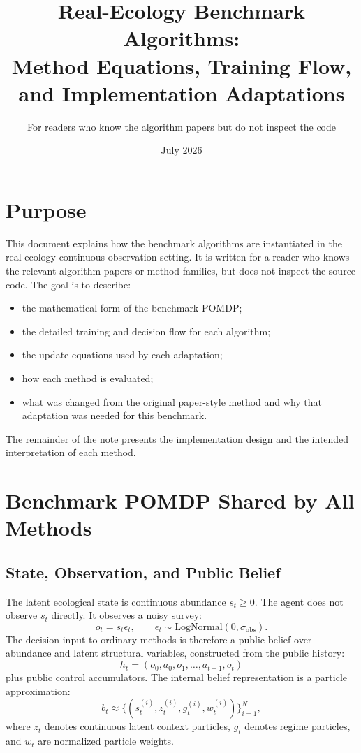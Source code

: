\documentclass[11pt]{article}
\title{Real-Ecology Benchmark Algorithms:\\Method Equations, Training Flow, and Implementation Adaptations}
\author{For readers who know the algorithm papers but do not inspect the code}
\date{July 2026}
\newcommand{\1}{\mathbf{1}}
\begin{document}
\sloppy
\maketitle

\section{Purpose}

This document explains how the benchmark algorithms are instantiated in the
real-ecology continuous-observation setting.  It is written for a reader who
knows the relevant algorithm papers or method families, but does not inspect the
source code.  The goal is to describe:
\begin{itemize}[leftmargin=*]
  \item the mathematical form of the benchmark POMDP;
  \item the detailed training and decision flow for each algorithm;
  \item the update equations used by each adaptation;
  \item how each method is evaluated;
  \item what was changed from the original paper-style method and why that
  adaptation was needed for this benchmark.
\end{itemize}

The remainder of the note presents the implementation design and the intended
interpretation of each method.

\section{Benchmark POMDP Shared by All Methods}

\subsection{State, Observation, and Public Belief}

The latent ecological state is continuous abundance $s_t\ge 0$.  The agent does
not observe $s_t$ directly.  It observes a noisy survey:
\[
  o_t = s_t\epsilon_t,\qquad
  \epsilon_t\sim\mathrm{LogNormal}(0,\sigma_{\mathrm{obs}}).
\]
The decision input to ordinary methods is therefore a public belief over
abundance and latent structural variables, constructed from the public history:
\[
  h_t=(o_0,a_0,o_1,\ldots,a_{t-1},o_t)
\]
plus public control accumulators.  The internal belief representation is a
particle approximation:
\[
  b_t \approx \{(s_t^{(i)}, z_t^{(i)}, g_t^{(i)}, w_t^{(i)})\}_{i=1}^N,
\]
where $z_t$ denotes continuous latent context particles, $g_t$ denotes regime
particles, and $w_t$ are normalized particle weights.
\end{document}
